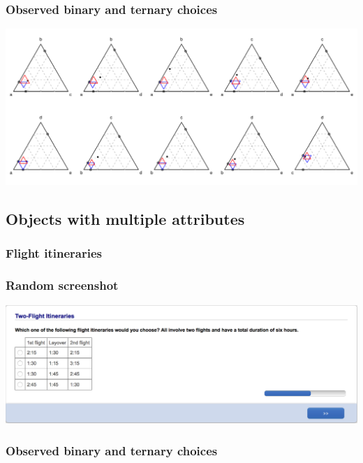 \documentclass[11pt,letter]{article}
\begin{document}
\subsubsection*{Observed binary and ternary choices}

\includegraphics[width=15cm]{./Population_study_data/Simplexes/hotel_rooms.pdf}

\pagebreak

\subsection*{Objects with multiple attributes}

\subsubsection{Flight itineraries}



\subsubsection*{Random screenshot}

\includegraphics[width=15cm]{Population_study_design/screenshot_itineraries.png}

\subsubsection*{Observed binary and ternary choices}
\end{document}
